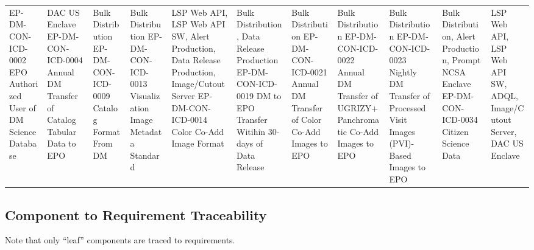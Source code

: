 \begin{xtabular}{p{0.4\textwidth}p{0.55\textwidth}}
EP-DM-CON-ICD-0002 EPO Authorized User of DM Science Database & DAC US Enclave
EP-DM-CON-ICD-0004 Annual DM Transfer of Catalog Tabular Data to EPO & Bulk Distribution
EP-DM-CON-ICD-0009 Catalog Format From DM & Bulk Distribution
EP-DM-CON-ICD-0013 Visualization Image Metadata Standard & LSP Web API, LSP Web API SW, Alert Production, Data Release Production, Image/Cutout Server
EP-DM-CON-ICD-0014 Color Co-Add Image Format & Bulk Distribution, Data Release Production
EP-DM-CON-ICD-0019 DM to EPO Transfer Witihin 30-days of Data Release & Bulk Distribution
EP-DM-CON-ICD-0021 Annual DM Transfer of Color Co-Add Images to EPO & Bulk Distribution
EP-DM-CON-ICD-0022 Annual DM Transfer of UGRIZY+Panchromatic Co-Add Images to EPO & Bulk Distribution
EP-DM-CON-ICD-0023 Nightly DM Transfer of Processed Visit Images (PVI)-Based Images to EPO & Bulk Distribution, Alert Production, Prompt NCSA Enclave
EP-DM-CON-ICD-0034 Citizen Science Data & LSP Web API, LSP Web API SW, ADQL, Image/Cutout Server, DAC US Enclave

\end{xtabular}
\normalsize

\subsection{Component to Requirement
Traceability}\label{component-to-requirement-traceability}

Note that only ``leaf'' components are traced to requirements.

